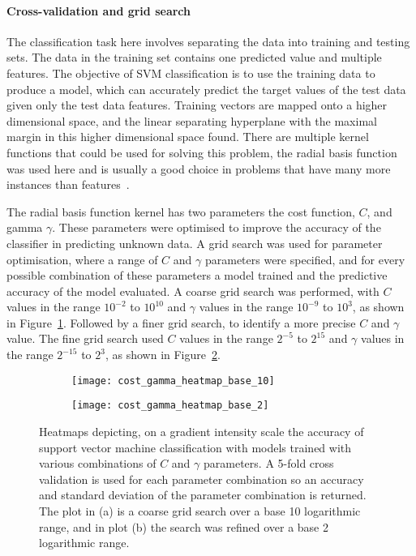 \paragraph{Cross-validation and grid search}
The classification task here involves separating the data into training and testing sets. The data in the training set contains one predicted value and multiple features. The objective of SVM classification is to use the training data to produce a model, which can accurately predict the target values of the test data given only the test data features. Training vectors are mapped onto a higher dimensional space, and the linear separating hyperplane with the maximal margin in this higher dimensional space found. There are multiple kernel functions that could be used for solving this problem, the radial basis function was used here and is usually a good choice in problems that have many more instances than features~\cite{Hsu2008}.

The radial basis function kernel has two parameters the cost function, $C$, and gamma $\gamma$. These parameters were optimised to improve the accuracy of the classifier in predicting unknown data. A grid search was used for parameter optimisation, where a range of $C$ and $\gamma$ parameters were specified, and for every possible combination of these parameters a model trained and the predictive accuracy of the model evaluated. A coarse grid search was performed, with $C$ values in the range $10^{-2}$ to $10^{10}$ and $\gamma$ values in the range $10^{-9}$ to $10^{3}$, as shown in Figure~\ref{figure:cost_gamma_heatmap:base10}. Followed by a finer grid search, to identify a more precise $C$ and $\gamma$ value. The fine grid search used $C$ values in the range $2^{-5}$ to $2^{15}$ and $\gamma$ values in the range $2^{-15}$ to $2^{3}$, as shown in Figure~\ref{figure:cost_gamma_heatmap:base2}.
\begin{figure}[htbp]{}
	\centering
	\begin{subfigure}[b]{0.7\linewidth}
		\texttt{[image: cost\_gamma\_heatmap\_base\_10]}
		\caption{}
		\label{figure:cost_gamma_heatmap:base10}
	\end{subfigure}
	\begin{subfigure}[b]{0.7\linewidth}
		\texttt{[image: cost\_gamma\_heatmap\_base\_2]}
		\caption{}
		\label{figure:cost_gamma_heatmap:base2}
	\end{subfigure}
\caption[Radial basis function grid-search parameter optimisation]{Heatmaps depicting, on a gradient intensity scale the accuracy of support vector machine classification with models trained with various combinations of $C$ and $\gamma$ parameters. A 5-fold cross validation is used for each parameter combination so an accuracy and standard deviation of the parameter combination is returned. The plot in (a) is a coarse grid search over a base 10 logarithmic range, and in plot (b) the search was refined over a base 2 logarithmic range.}
\label{figure:cost_gamma_heatmap}
\end{figure}

